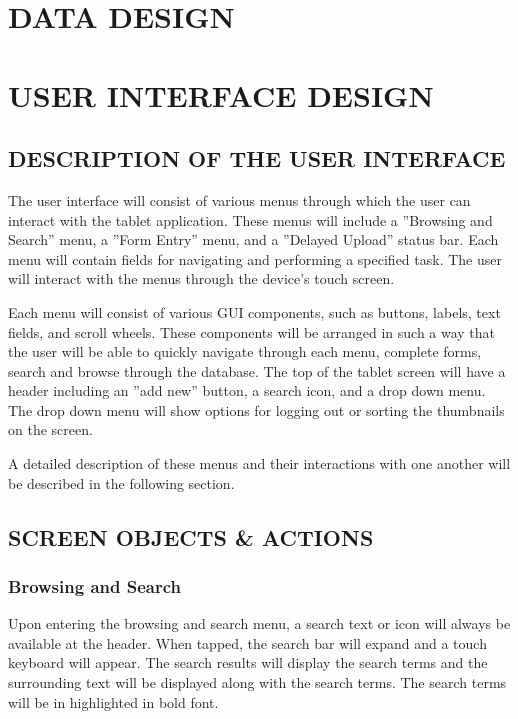 \documentclass[twoside,letterpaper]{article}
\begin{document}
{\clearpage\section[DATA DESIGN]{\rmfamily\bfseries\color{black}
DATA DESIGN}

\clearpage\section[USER INTERFACE DESIGN]{\rmfamily\bfseries\color{black}
USER INTERFACE DESIGN}

\subsection[DESCRIPTION OF THE USER INTERFACE]{\rmfamily\bfseries\color{black}
DESCRIPTION OF THE USER INTERFACE}
{\rmfamily\color{black}
The user interface will consist of various menus through which the user can interact with the tablet application. These menus will include a ''Browsing and Search'' menu, a ''Form Entry'' menu, and a ''Delayed Upload'' status bar. Each menu will contain fields for navigating and performing a specified task. The user will interact with the menus through the device's touch screen.
\newline

\noindent Each menu will consist of various GUI components, such as buttons, labels, text fields, and scroll wheels. These components will be arranged in such a way that the user will be able to quickly navigate through each menu, complete forms, search and browse through the database.
The top of the tablet screen will have a header including an ''add new'' button, a search icon, and a drop down menu. The drop down menu will show options for logging out or sorting the thumbnails on the screen.
\newline

\noindent A detailed description of these menus and their interactions with one another will be described in the following section.
}
\newpage
\subsection[SCREEN OBJECTS \& ACTIONS]{\rmfamily\bfseries\color{black}
SCREEN OBJECTS \& ACTIONS}
\subsubsection[Browsing and Search]{\rmfamily\bfseries\color{black}
Browsing and Search}
Upon entering the browsing and search menu, a search text or icon will always be available at the header. When tapped, the search bar will expand and a touch keyboard will appear. The search results will display the search terms and the surrounding text will be displayed along with the search terms. The search terms will be in highlighted in bold font.
\newline

}
\end{document}
